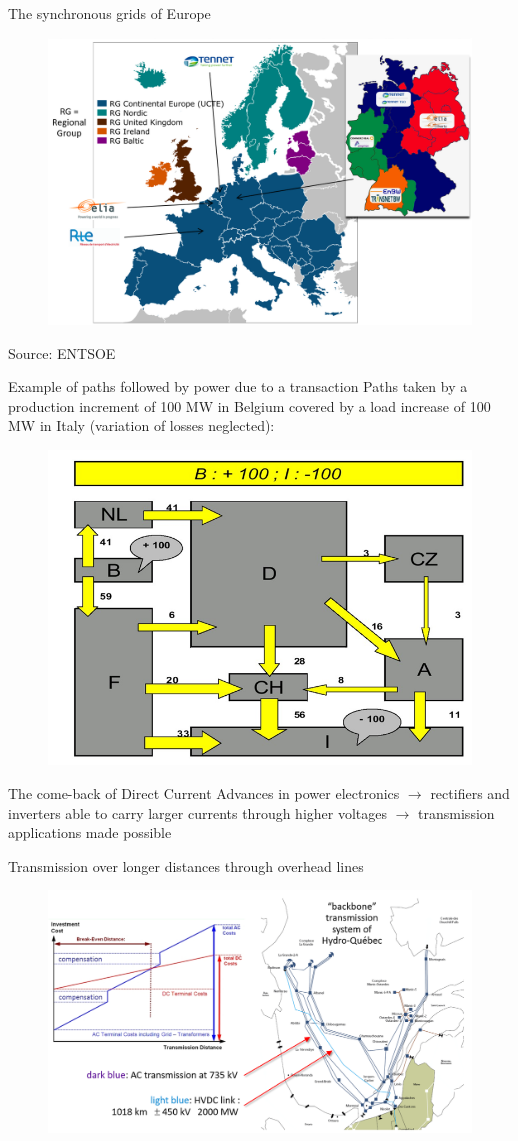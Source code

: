 \begin{frame}
{The synchronous grids of Europe}
\begin{figure}
\centering
\includegraphics[width=0.6\linewidth]{images/EU_TSOs.png}
\end{figure}
\vfill
\footnotesize{Source: ENTSOE}
\end{frame}

\begin{frame}
{Example of paths followed by power due to a transaction}
Paths taken by a production increment of 100 MW in Belgium
covered by a load increase of 100 MW in Italy (variation of losses neglected):
\begin{figure}
\centering
\includegraphics[width=0.4\linewidth]{images/EU_path_flows.png}
\end{figure}
\end{frame}

\begin{frame}
{The come-back of Direct Current}
Advances in power electronics $\rightarrow$ rectifiers and inverters able to carry larger currents through higher voltages $\rightarrow$ transmission applications made possible
\end{frame}

\begin{frame}{Transmission over longer distances through overhead lines}
\begin{figure}
\centering
\includegraphics[width=0.7\linewidth]{images/DC_line.png}
\end{figure}
\end{frame}


